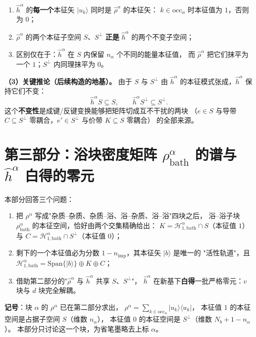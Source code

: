 \documentclass[11pt]{ctexart}
\begin{document}
\begin{enumerate}
\item $\hat h^\alpha$ 的\textbf{每一个}本征矢 $|u_k\rangle$ 同时是 $\hat\rho^\alpha$ 的本征矢：
$k\in\mathrm{occ}_\alpha$ 时本征值为 $1$，否则为 $0$；
\item $\hat\rho^\alpha$ 的两个本征子空间 $S$、$S^{\perp}$
\textbf{正是} $\hat h^\alpha$ 的两个不变子空间；
\item 区别仅在于：$\hat h^\alpha$ 在 $S$ 内保留 $n_\alpha$ 个不同的能量本征值，
而 $\hat\rho^\alpha$ 把它们抹平为一个 $1$；$S^{\perp}$ 内同理抹平为 $0$。
\end{enumerate}

\textbf{（3）关键推论（后续构造的地基）。}
由于 $S$ 与 $S^{\perp}$ 由 $\hat h^\alpha$ 的本征模式张成，$\hat h^\alpha$ 保持它们不变：
\[
\hat h^\alpha S\subseteq S,\qquad \hat h^\alpha S^{\perp}\subseteq S^{\perp} .
\]
这个\textbf{不变性}是成键/反键变换能够把矩阵切成互不干扰的两块
（$e\in S$ 与导带 $C\subseteq S^{\perp}$ 零耦合，$e'\in S^{\perp}$ 与价带 $K\subseteq S$ 零耦合）
的全部来源。

\medskip
\section*{第三部分：浴块密度矩阵 $\rho_{\mathrm{bath}}^\alpha$ 的谱与 $\hat h^\alpha$ 白得的零元}

\noindent 本部分回答三个问题：
\begin{enumerate}
\item 把 $\rho^\alpha$ 写成"杂质--杂质、杂质--浴、浴--杂质、浴--浴"四块之后，
浴--浴子块 $\rho_{\mathrm{bath}}^\alpha$ 的本征空间，恰好由两个交集精确给出：
$K=\mathcal{H}_{1,\mathrm{bath}}^\alpha\cap S$（本征值 $1$）与
$C=\mathcal{H}_{1,\mathrm{bath}}^\alpha\cap S^{\perp}$（本征值 $0$）；
\item 剩下的一个本征值必为分数 $1-n_{\mathrm{imp}}$，其本征矢 $|b\rangle$ 是唯一的
"活性轨道"，且 $\mathcal{H}_{1,\mathrm{bath}}^\alpha=\mathrm{Span}\{|b\rangle\}\oplus K\oplus C$；
\item 借助第二部分的"$\hat\rho^\alpha$ 与 $\hat h^\alpha$ 共享 $S$、$S^{\perp}$"，
$\hat h^\alpha$ 在新基下\textbf{白得}一批严格零元：$v$ 块与 $d$ 块完全解耦。
\end{enumerate}

\medskip
\noindent\textbf{记号}：块 $\alpha$ 的 $\rho^\alpha$ 已在第二部分求出，
$\rho^\alpha=\sum_{k\in\mathrm{occ}_\alpha}|u_k\rangle\langle u_k|$，
本征值 $1$ 的本征空间是占据子空间 $S$（维数 $n_\alpha$），
本征值 $0$ 的本征空间是 $S^{\perp}$（维数 $N_b+1-n_\alpha$）。
本部分只讨论这一个块，为省笔墨略去上标 $\alpha$。
\end{document}
